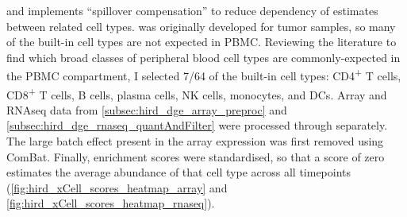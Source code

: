and implements \enquote{spillover compensation} to reduce dependency of estimates between related cell types\autocite{aran2017XCellDigitallyPortraying}.
%
%
 was originally developed for tumor samples, so many of the built-in cell types are not expected in \gls{PBMC}.
Reviewing the literature to find which broad classes of peripheral blood cell types are commonly-expected in the \gls{PBMC} compartment\autocite{kleiveland2015PeripheralBloodMononuclear,vanderwijst2018SinglecellRNASequencing,davenport2018DiscoveringVivoCytokineeQTL},
I selected 7/64 of the built-in cell types: CD4\textsuperscript{+} T cells, CD8\textsuperscript{+} T cells, B cells, plasma cells, \gls{NK} cells, monocytes, and \glspl{DC}.
Array and \gls{RNAseq} data from \autoref{subsec:hird_dge_array_preproc} and \autoref{subsec:hird_dge_rnaseq_quantAndFilter} were processed through  separately.
The large batch effect present in the array expression was first removed using ComBat.
Finally, enrichment scores were standardised, so that a score of zero estimates the average abundance of that cell type across all timepoints (\autoref{fig:hird_xCell_scores_heatmap_array} and \autoref{fig:hird_xCell_scores_heatmap_rnaseq}).

